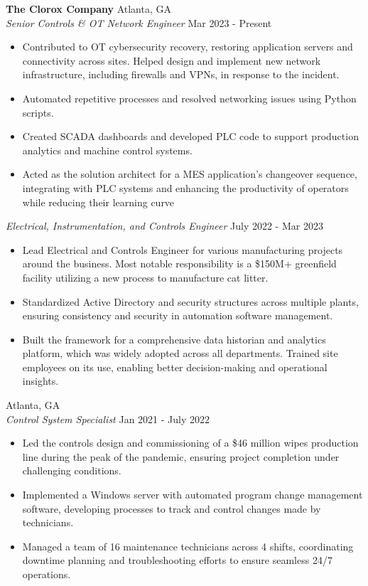 \documentclass[a4paper]{article}
\begin{document}
\textbf{The Clorox Company} \hfill Atlanta, GA\\
\textit{Senior Controls \& OT Network Engineer} \hfill Mar 2023 - Present\\
\vspace{-1mm}
\begin{itemize} \itemsep 1pt
	\item Contributed to OT cybersecurity recovery, restoring application servers and connectivity across sites. Helped design and implement new network infrastructure, including firewalls and VPNs, in response to the incident.
	\item Automated repetitive processes and resolved networking issues using Python scripts.
	\item Created SCADA dashboards and developed PLC code to support production analytics and machine control systems.
	\item Acted as the solution architect for a MES application’s changeover sequence, integrating with PLC systems and enhancing the productivity of operators while reducing their learning curve
\end{itemize}
\textit{Electrical, Instrumentation, and Controls Engineer} \hfill July 2022 - Mar 2023\\
\vspace{-1mm}
\begin{itemize} \itemsep 1pt
	\item Lead Electrical and Controls Engineer for various manufacturing projects around the business. Most notable responsibility is a \$150M+ greenfield facility utilizing a new process to manufacture cat litter.
	\item Standardized Active Directory and security structures across multiple plants, ensuring consistency and security in automation software management.
	\item Built the framework for a comprehensive data historian and analytics platform, which was widely adopted across all departments. Trained site employees on its use, enabling better decision-making and operational insights.
\end{itemize}
\hfill Atlanta, GA\\
\textit{Control System Specialist} \hfill Jan 2021 - July 2022\\
\vspace{-1mm}
\begin{itemize} \itemsep 1pt
	\item Led the controls design and commissioning of a \$46 million wipes production line during the peak of the pandemic, ensuring project completion under challenging conditions.
	\item Implemented a Windows server with automated program change management software, developing processes to track and control changes made by technicians.
	\item Managed a team of 16 maintenance technicians across 4 shifts, coordinating downtime planning and troubleshooting efforts to ensure seamless 24/7 operations.
\end{itemize}
\end{document}
